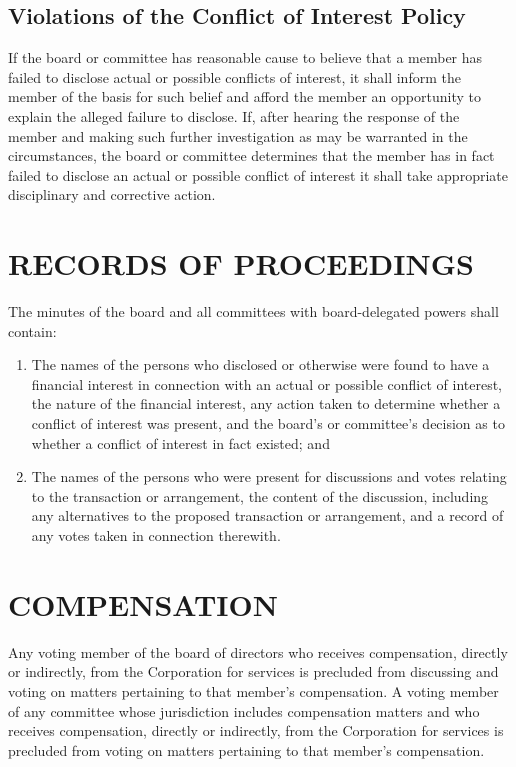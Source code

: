 \documentclass{article}
\begin{document}
\subsection{Violations of the Conflict of Interest Policy}
If the board or committee has reasonable cause to believe that a member has failed to disclose actual or possible conflicts of interest, it shall inform the member of the basis for such belief and afford the member an opportunity to explain the alleged failure to disclose.
If, after hearing the response of the member and making such further investigation as may be warranted in the circumstances, the board or committee determines that the member has in fact failed to disclose an actual or possible conflict of interest it shall take appropriate disciplinary and corrective action.
\section{RECORDS OF PROCEEDINGS}
The minutes of the board and all committees with board-delegated powers shall contain:
\renewcommand{\labelenumi}{\alph{enumi}$)$}
\begin{enumerate}
\item The names of the persons who disclosed or otherwise were found to have a financial interest in connection with an actual or possible conflict of interest, the nature of the financial interest, any action taken to determine whether a conflict of interest was present, and the board’s or committee’s decision as to whether a conflict of interest in fact existed; and
\item The names of the persons who were present for discussions and votes relating to the transaction or arrangement, the content of the discussion, including any alternatives to the proposed transaction or arrangement, and a record of any votes taken in connection therewith.
\end{enumerate}
\section{COMPENSATION}
Any voting member of the board of directors who receives compensation, directly or indirectly, from the Corporation for services is precluded from discussing and voting on matters pertaining to that member’s compensation.
A voting member of any committee whose jurisdiction includes compensation matters and who receives compensation, directly or indirectly, from the Corporation for services is precluded from voting on matters pertaining to that member’s compensation.
\end{document}

